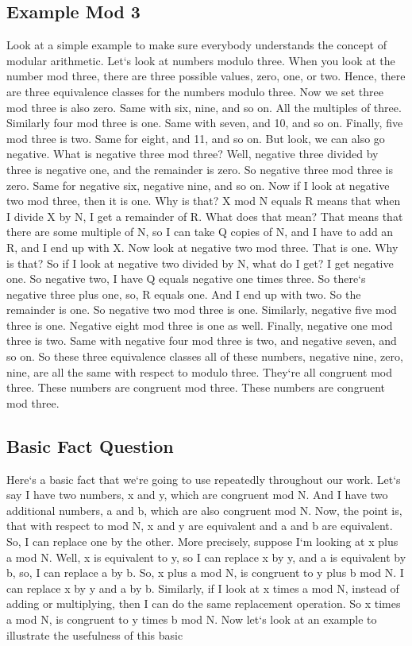 \subsection{Example  Mod 3}
Look at a simple example to make sure everybody understands the concept of modular arithmetic.
Let`s look at numbers modulo three.
When you look at the number mod three, there are three possible values, zero, one, or two.
Hence, there are three equivalence classes for the numbers modulo three.
Now we set three mod three is also zero.
Same with six, nine, and so on.
All the multiples of three.
Similarly four mod three is one.
Same with seven, and 10, and so on.
Finally, five mod three is two.
Same for eight, and 11, and so on.
But look, we can also go negative.
What is negative three mod three? Well, negative three divided by three is negative one, and the remainder is zero.
So negative three mod three is zero.
Same for negative six, negative nine, and so on.
Now if I look at negative two mod three, then it is one.
Why is that? X mod N equals R means that when I divide X by N, I get a remainder of R\@.
What does that mean? That means that there are some multiple of N, so I can take Q copies of N, and I have to add an R, and I end up with X\@.
Now look at negative two mod three.
That is one.
Why is that? So if I look at negative two divided by N, what do I get? I get negative one.
So negative two, I have Q equals negative one times three.
So there`s negative three plus one, so, R equals one.
And I end up with two.
So the remainder is one.
So negative two mod three is one.
Similarly, negative five mod three is one.
Negative eight mod three is one as well.
Finally, negative one mod three is two.
Same with negative four mod three is two, and negative seven, and so on.
So these three equivalence classes all of these numbers, negative nine, zero, nine, are all the same with respect to modulo three.
They`re all congruent mod three.
These numbers are congruent mod three.
These numbers are congruent mod three.

\subsection{Basic Fact Question}
Here`s a basic fact that we`re going to use repeatedly throughout our work.
Let`s say I have two numbers, x and y, which are congruent mod N\@.
And I have two additional numbers, a and b, which are also congruent mod N\@.
Now, the point is, that with respect to mod N, x and y are equivalent and a and b are equivalent.
So, I can replace one by the other.
More precisely, suppose I`m looking at x plus a mod N\@.
Well, x is equivalent to y, so I can replace x by y, and a is equivalent by b, so, I can replace a by b.
So, x plus a mod N, is congruent to y plus b mod N\@.
I can replace x by y and a by b.
Similarly, if I look at x times a mod N, instead of adding or multiplying, then I can do the same replacement operation.
So x times a mod N, is congruent to y times b mod N\@.
Now let`s look at an example to illustrate the usefulness of this basic

